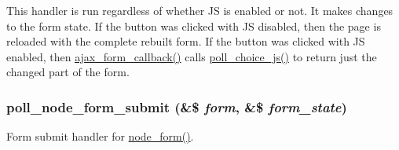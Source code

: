 This handler is run regardless of whether JS is enabled or not. It makes changes to the form state. If the button was clicked with JS disabled, then the page is reloaded with the complete rebuilt form. If the button was clicked with JS enabled, then \hyperlink{group__ajax_gabe2739824006df057d291f6be49759ab}{ajax\_\-form\_\-callback()} calls \hyperlink{poll_8module_a31f17036375b3e47f128839d9c4b11b9}{poll\_\-choice\_\-js()} to return just the changed part of the form. \hypertarget{poll_8module_a15040a8b0629fe567cbb1b7313c2368f}{
\subsubsection[{poll\_\-node\_\-form\_\-submit}]{\setlength{\rightskip}{0pt plus 5cm}poll\_\-node\_\-form\_\-submit (\&\$ {\em form}, \/  \&\$ {\em form\_\-state})}}
\label{poll_8module_a15040a8b0629fe567cbb1b7313c2368f}
Form submit handler for \hyperlink{group__forms_ga267299500e205db099ee4e8396769d3f}{node\_\-form()}.

